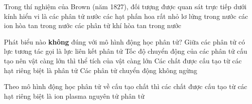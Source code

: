 \begin{ex}
	{\color{red}\footnotesize\ttfamily [L12C1B1-TN-45]}\par %
	Trong thí nghiệm của Brown (năm 1827), đối tượng được quan sát trực tiếp dưới kính hiển vi là
	\choice
	{các phân tử nước}
	{\True các hạt phấn hoa rất nhỏ lơ lửng trong nước}
	{các ion hòa tan trong nước}
	{các phân tử khí hòa tan trong nước}
\end{ex}

\begin{ex}
	{\color{red}\footnotesize\ttfamily [L12C1B1-TN-2]}\par %
	Phát biểu nào \textbf{không} đúng với mô hình động học phân tử?
	\choice
	{Giữa các phân tử có lực tương tác gọi là lực liên kết phân tử}
	{\True Tốc độ chuyển động của các phân tử cấu tạo nên vật càng lớn thì thể tích của vật càng lớn}
	{Các chất được cấu tạo từ các hạt riêng biệt là phân tử}
	{Các phân tử chuyển động không ngừng}
\end{ex}

\begin{ex}
	{\color{red}\footnotesize\ttfamily [L12C1B1-TN-17]}\par %
	Theo mô hình động học phân tử về cấu tạo chất thì các chất được cấu tạo từ các hạt riêng biệt là
	\choice
	{ion}
	{plasma}
	{nguyên tử}
	{\True phân tử}
\end{ex}


